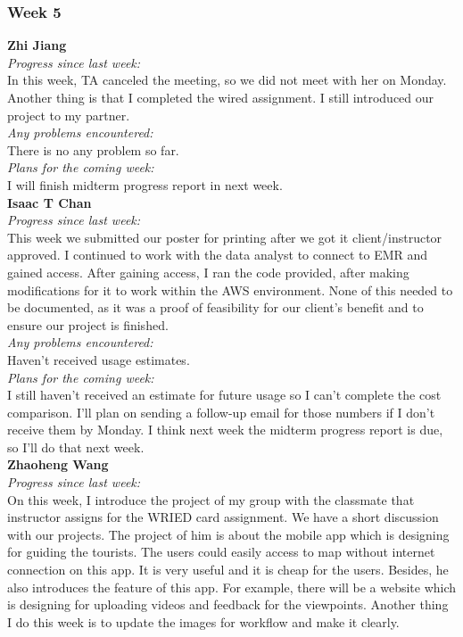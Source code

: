 \subsubsection{Week 5}
\textbf{Zhi Jiang}\\
\noindent\textit{Progress since last week:}\\
In this week, TA canceled the meeting, so we did not meet with her on Monday. Another thing is that I completed the wired assignment. I still introduced our project to my partner.\\

\noindent\textit{Any problems encountered:}\\
There is no any problem so far.\\

\noindent\textit{Plans for the coming week:}\\
I will finish midterm progress report in next week.\\

\noindent\textbf{Isaac T Chan}\\
\noindent\textit{Progress since last week:}\\
This week we submitted our poster for printing after we got it client/instructor approved. I continued to work with the data analyst to connect to EMR and gained access. After gaining access, I ran the code provided, after making modifications for it to work within the AWS environment. None of this needed to be documented, as it was a proof of feasibility for our client's benefit and to ensure our project is finished.\\

\noindent\textit{Any problems encountered:}\\
Haven't received usage estimates.\\

\noindent\textit{Plans for the coming week:}\\
I still haven't received an estimate for future usage so I can't complete the cost comparison. I'll plan on sending a follow-up email for those numbers if I don't receive them by Monday. I think next week the midterm progress report is due, so I'll do that next week.\\

\noindent\textbf{Zhaoheng Wang}\\
\noindent\textit{Progress since last week:}\\
On this week, I introduce the project of my group with the classmate that instructor assigns for the WRIED card assignment. We have a short discussion with our projects. The project of him is about the mobile app which is designing for guiding the tourists. The users could easily access to map without internet connection on this app. It is very useful and it is cheap for the users. Besides, he also introduces the feature of this app. For example, there will be a website which is designing for uploading videos and feedback for the viewpoints. Another thing I do this week is to update the images for workflow and make it clearly.\\

